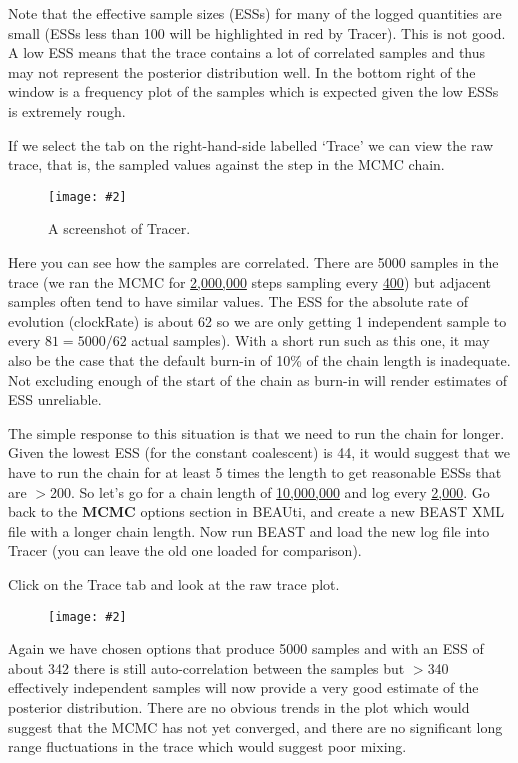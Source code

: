 \documentclass[12pt]{article}
\newcommand{\includeimage}[2][]{%
\texttt{[image: \#2]}
}
\newcommand{\chainLength}{{2,000,000}}
\newcommand{\logEvery}{{400}}
\newcommand{\chainLengthLong}{{10,000,000}}
\newcommand{\logEveryLong}{{2,000}}
\newcommand{\lowestESS}{{44}}
\begin{document}
Note that the effective sample sizes (ESSs) for many of the logged quantities are small (ESSs less than 100 will be highlighted in red by Tracer).
This is not good. A low ESS means that the trace contains a lot of correlated samples and thus may not represent the
posterior distribution well. In the bottom right of the window is a frequency plot of the samples which is expected given the
low ESSs is extremely rough.

If we select the tab on the right-hand-side labelled `Trace' we can view the raw trace, that is, the sampled values against the step in the MCMC chain.

\begin{figure}
\centering	
\includeimage[width=0.8\textwidth]{figures/Tracer1}
\label{fig:Tracer1}
\caption{A screenshot of Tracer.}
\end{figure}

Here you can see how the samples are correlated. There are 5000 samples in the trace (we ran the MCMC for \underline{\chainLength{}}
steps sampling every \underline{\logEvery{}}) but adjacent samples often tend to have similar values. The ESS for the absolute rate of evolution (clockRate) is about 62 so we are only getting 1 independent sample to every $81=5000/62$ actual samples). With a short run such as this one, it may also be the case that the default burn-in of 10\% of the chain length is inadequate. Not excluding enough of the start of the chain as burn-in will render estimates of ESS unreliable.

The simple response to this situation is that we need to run the chain for longer. Given the lowest ESS (for the constant coalescent) is \lowestESS{}, it
would suggest that we have to run the chain for at least 5 times the length to get reasonable ESSs that are $>$200. 
So let's go for a chain length of \underline{\chainLengthLong{}} and log every \underline{\logEveryLong{}}. Go back to the {\bf MCMC} options section in BEAUti, and create a new BEAST XML file with a longer chain length. Now run BEAST and load the new log file into Tracer (you can leave the old one loaded
for comparison). 

Click on the Trace tab and look at the raw trace plot.

\begin{figure}
\centering	
\includeimage[width=0.8\textwidth]{figures/Tracer2}
\label{fig:Tracer2}
\end{figure}

Again we have chosen options that produce 5000 samples and with an ESS of about 342 there is still auto-correlation
between the samples but $>$340 effectively independent samples will now provide a very good estimate of the posterior distribution.
There are no obvious trends in the plot which would suggest that the MCMC has not yet converged, and there are no significant long range 
fluctuations in the trace which would suggest poor mixing.
\end{document}
